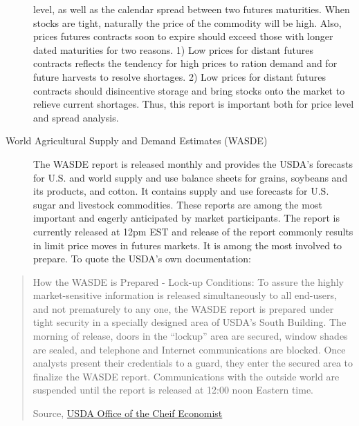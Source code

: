 \documentclass[]{book}
\theoremstyle{definition}
\theoremstyle{definition}
\theoremstyle{remark}
\begin{document}
\begin{description}
level, as well as the calendar spread between two futures maturities.
When stocks are tight, naturally the price of the commodity will be
high. Also, prices futures contracts soon to expire should exceed those
with longer dated maturities for two reasons. 1) Low prices for distant
futures contracts reflects the tendency for high prices to ration demand
and for future harvests to resolve shortages. 2) Low prices for distant
futures contracts should disincentive storage and bring stocks onto the
market to relieve current shortages. Thus, this report is important both
for price level and spread analysis.
\item[World Agricultural Supply and Demand Estimates (WASDE)]
The WASDE report is released monthly and provides the USDA's forecasts
for U.S. and world supply and use balance sheets for grains, soybeans
and its products, and cotton. It contains supply and use forecasts for
U.S. sugar and livestock commodities. These reports are among the most
important and eagerly anticipated by market participants. The report is
currently released at 12pm EST and release of the report commonly
results in limit price moves in futures markets. It is among the most
involved to prepare. To quote the USDA's own documentation:
\end{description}

\begin{quote}
How the WASDE is Prepared - Lock-up Conditions: To assure the highly
market-sensitive information is released simultaneously to all
end-users, and not prematurely to any one, the WASDE report is prepared
under tight security in a specially designed area of USDA's South
Building. The morning of release, doors in the ``lockup'' area are
secured, window shades are sealed, and telephone and Internet
communications are blocked. Once analysts present their credentials to a
guard, they enter the secured area to finalize the WASDE report.
Communications with the outside world are suspended until the report is
released at 12:00 noon Eastern time.

Source, \href{http://www.usda.gov/oce/commodity/wasde/prepared.htm}{USDA
Office of the Cheif Economist}
\end{quote}
\end{document}
